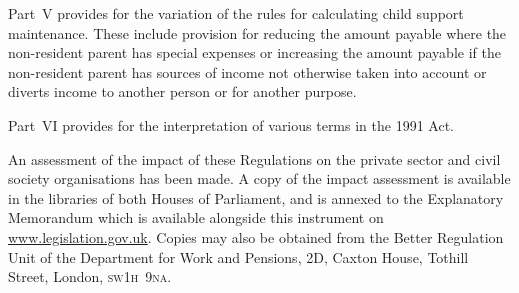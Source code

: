 \documentclass[12pt,a4paper]{article}
\begin{document}
Part~V provides for the variation of the rules for calculating child support maintenance. These include provision for reducing the amount payable where the non-resident parent has special expenses or increasing the amount payable if the non-resident parent has sources of income not otherwise taken into account or diverts income to another person or for another purpose.

Part~VI provides for the interpretation of various terms in the 1991 Act.

An assessment of the impact of these Regulations on the private sector and civil society organisations has been made. A copy of the impact assessment is available in the libraries of both Houses of Parliament, and is annexed to the Explanatory Memorandum which is available alongside this instrument on \url{www.legislation.gov.uk}. Copies may also be obtained from the Better Regulation Unit of the Department for Work and Pensions, 2D, Caxton House, Tothill Street, London, \textsc{\lowercase{SW1H~9NA}}. 
\end{document}
